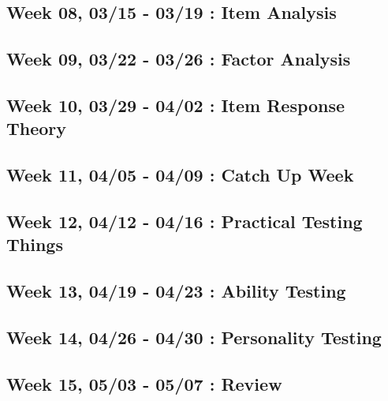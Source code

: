 \documentclass[11pt,]{article}
\begin{document}
\hypertarget{week-08-0315---0319-item-analysis}{%
\subsection{Week 08, 03/15 - 03/19 : Item
Analysis}\label{week-08-0315---0319-item-analysis}}

\hypertarget{week-09-0322---0326-factor-analysis}{%
\subsection{Week 09, 03/22 - 03/26 : Factor
Analysis}\label{week-09-0322---0326-factor-analysis}}

\hypertarget{week-10-0329---0402-item-response-theory}{%
\subsection{Week 10, 03/29 - 04/02 : Item Response
Theory}\label{week-10-0329---0402-item-response-theory}}

\hypertarget{week-11-0405---0409-catch-up-week}{%
\subsection{Week 11, 04/05 - 04/09 : Catch Up
Week}\label{week-11-0405---0409-catch-up-week}}

\hypertarget{week-12-0412---0416-practical-testing-things}{%
\subsection{Week 12, 04/12 - 04/16 : Practical Testing
Things}\label{week-12-0412---0416-practical-testing-things}}

\hypertarget{week-13-0419---0423-ability-testing}{%
\subsection{Week 13, 04/19 - 04/23 : Ability
Testing}\label{week-13-0419---0423-ability-testing}}

\hypertarget{week-14-0426---0430-personality-testing}{%
\subsection{Week 14, 04/26 - 04/30 : Personality
Testing}\label{week-14-0426---0430-personality-testing}}

\hypertarget{week-15-0503---0507-review}{%
\subsection{Week 15, 05/03 - 05/07 :
Review}\label{week-15-0503---0507-review}}
\end{document}
